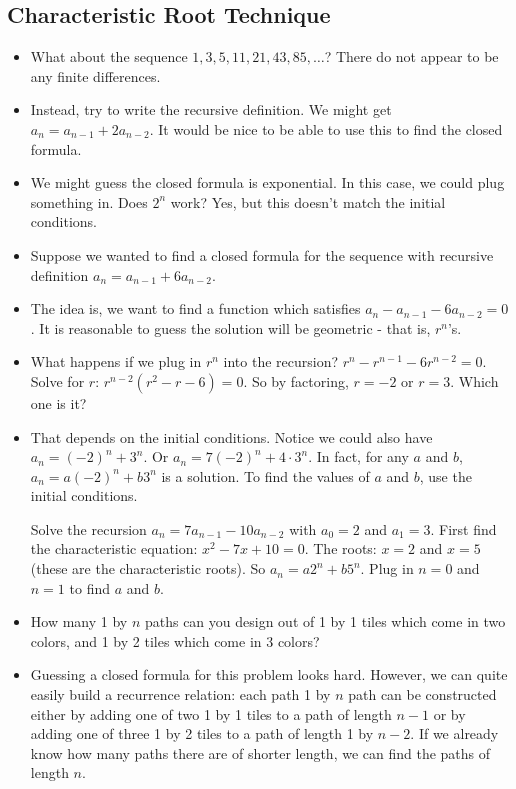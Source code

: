 \documentclass[12pt]{article}
\theoremstyle{plain}
\theoremstyle{definition}
\theoremstyle{remark}
\newcommand{\ex}{\noindent{\bf Ex: }}
\begin{document}
 \subsection*{Characteristic Root Technique}
 \begin{itemize}
   \item What about the sequence $1, 3, 5, 11, 21, 43, 85, \ldots$?  There do not appear to be any finite differences.

   \item Instead, try to write the recursive definition.  We might get $a_n = a_{n-1} + 2 a_{n-2}$.  It would be nice to be able to use this to find the closed formula.

   \item We might guess the closed formula is exponential.  In this case, we could plug something in.  Does $2^n$ work?  Yes, but this doesn't match the initial conditions.


	\item Suppose we wanted to find a closed formula for the sequence with recursive definition $a_n = a_{n-1} + 6a_{n-2}$.

  \item The idea is, we want to find a function which satisfies $a_n - a_{n-1} - 6a_{n-2} = 0$.  It is reasonable to guess the solution will be geometric - that is, $r^n$'s.

  \item What happens if we plug in $r^n$ into the recursion?   $r^n - r^{n-1} - 6r^{n-2} = 0$.  Solve for $r$: $r^{n-2}(r^2 - r - 6) = 0$.  So by factoring, $r = -2$ or $r = 3$.  Which one is it?

  \item That depends on the initial conditions.  Notice we could also have $a_n = (-2)^n + 3^n$.  Or $a_n = 7(-2)^n + 4\cdot 3^n$.  In fact, for any $a$ and $b$, $a_n = a(-2)^n + b 3^n$ is a solution.  To find the values of $a$ and $b$, use the initial conditions.

  \ex Solve the recursion $a_n = 7a_{n-1} - 10 a_{n-2}$ with $a_0 = 2$ and $a_1 = 3$.  First find the characteristic equation: $x^2 - 7x + 10 = 0$.  The roots: $x = 2$ and $x = 5$ (these are the characteristic roots).  So $a_n = a 2^n + b 5^n$.  Plug in $n = 0$ and $n = 1$ to find $a$ and $b$.


  \item How many 1 by $n$ paths can you design out of 1 by 1 tiles which come in two colors, and 1 by 2 tiles which come in 3 colors?

  \item Guessing a closed formula for this problem looks hard.  However, we can quite easily build a recurrence relation: each path 1 by $n$ path can be constructed either by adding one of two 1 by 1 tiles to a path of length $n-1$ or by adding one of three 1 by 2 tiles to a path of length 1 by $n-2$.  If we already know how many paths there are of shorter length, we can find the paths of length $n$.


\end{itemize}
\end{document}
